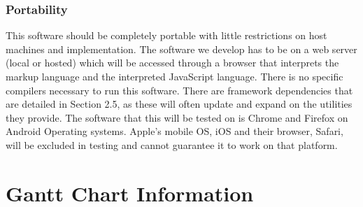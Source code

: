 \documentclass[letterpaper,10pt,draftclsnofoot,onecolumn,compsoc]{IEEEtran}
\begin{document}
\begin{singlespace}
\subsubsection{Portability}
\begin{singlespace}
\noindent
This software should be completely portable with little restrictions on host machines and implementation. The software we develop has to be on a web server (local or hosted) which will be accessed through a browser that interprets the markup language and the interpreted JavaScript language. There is no specific compilers necessary to run this software. There are framework dependencies that are detailed in Section 2.5, as these will often update and expand on the utilities they provide. The software that this will be tested on is Chrome and Firefox on Android Operating systems. Apple's mobile OS, iOS and their browser, Safari, will be excluded in testing and cannot guarantee it to work on that platform.
\end{singlespace}

\end{singlespace}

\section{Gantt Chart Information}
\end{document}
